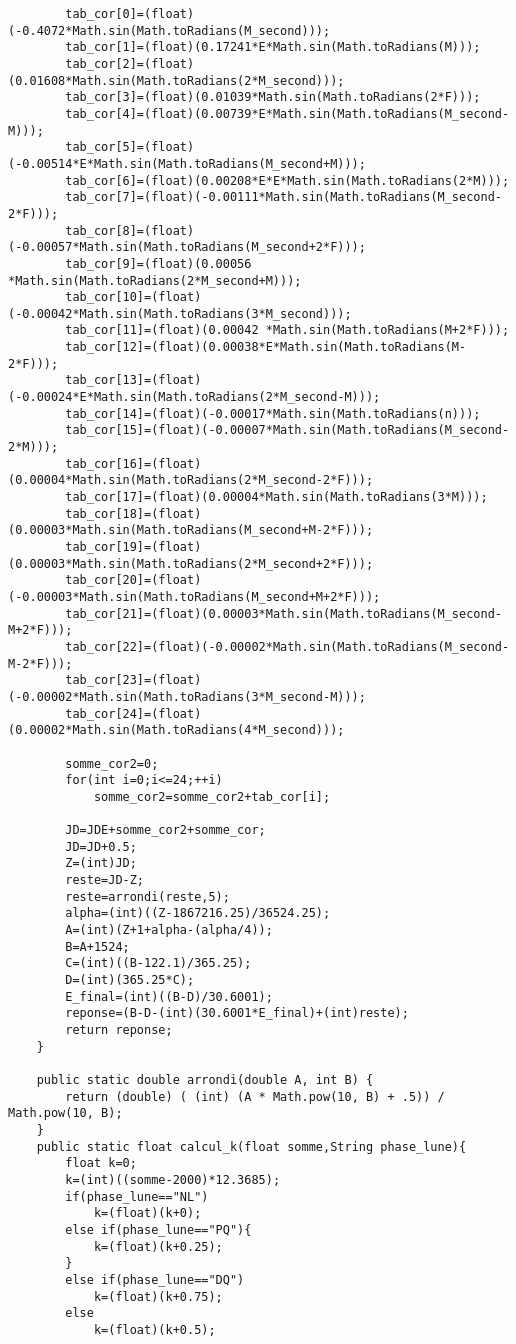 \begin{lstlisting}
        tab_cor[0]=(float)(-0.4072*Math.sin(Math.toRadians(M_second)));
        tab_cor[1]=(float)(0.17241*E*Math.sin(Math.toRadians(M)));
        tab_cor[2]=(float)(0.01608*Math.sin(Math.toRadians(2*M_second)));
        tab_cor[3]=(float)(0.01039*Math.sin(Math.toRadians(2*F)));
        tab_cor[4]=(float)(0.00739*E*Math.sin(Math.toRadians(M_second-M)));
        tab_cor[5]=(float)(-0.00514*E*Math.sin(Math.toRadians(M_second+M)));
        tab_cor[6]=(float)(0.00208*E*E*Math.sin(Math.toRadians(2*M)));
        tab_cor[7]=(float)(-0.00111*Math.sin(Math.toRadians(M_second-2*F)));
        tab_cor[8]=(float)(-0.00057*Math.sin(Math.toRadians(M_second+2*F)));
        tab_cor[9]=(float)(0.00056 *Math.sin(Math.toRadians(2*M_second+M)));
        tab_cor[10]=(float)(-0.00042*Math.sin(Math.toRadians(3*M_second)));
        tab_cor[11]=(float)(0.00042 *Math.sin(Math.toRadians(M+2*F)));
        tab_cor[12]=(float)(0.00038*E*Math.sin(Math.toRadians(M-2*F)));
        tab_cor[13]=(float)(-0.00024*E*Math.sin(Math.toRadians(2*M_second-M)));
        tab_cor[14]=(float)(-0.00017*Math.sin(Math.toRadians(n)));
        tab_cor[15]=(float)(-0.00007*Math.sin(Math.toRadians(M_second-2*M)));
        tab_cor[16]=(float)(0.00004*Math.sin(Math.toRadians(2*M_second-2*F)));
        tab_cor[17]=(float)(0.00004*Math.sin(Math.toRadians(3*M)));
        tab_cor[18]=(float)(0.00003*Math.sin(Math.toRadians(M_second+M-2*F)));
        tab_cor[19]=(float)(0.00003*Math.sin(Math.toRadians(2*M_second+2*F)));
        tab_cor[20]=(float)(-0.00003*Math.sin(Math.toRadians(M_second+M+2*F)));
        tab_cor[21]=(float)(0.00003*Math.sin(Math.toRadians(M_second-M+2*F)));
        tab_cor[22]=(float)(-0.00002*Math.sin(Math.toRadians(M_second-M-2*F)));
        tab_cor[23]=(float)(-0.00002*Math.sin(Math.toRadians(3*M_second-M)));
        tab_cor[24]=(float)(0.00002*Math.sin(Math.toRadians(4*M_second)));

        somme_cor2=0;
        for(int i=0;i<=24;++i)
            somme_cor2=somme_cor2+tab_cor[i];

        JD=JDE+somme_cor2+somme_cor;
        JD=JD+0.5;
        Z=(int)JD;
        reste=JD-Z;
        reste=arrondi(reste,5);
        alpha=(int)((Z-1867216.25)/36524.25);
        A=(int)(Z+1+alpha-(alpha/4));
        B=A+1524;
        C=(int)((B-122.1)/365.25);
        D=(int)(365.25*C);
        E_final=(int)((B-D)/30.6001);
        reponse=(B-D-(int)(30.6001*E_final)+(int)reste);
        return reponse;
    }

    public static double arrondi(double A, int B) {
        return (double) ( (int) (A * Math.pow(10, B) + .5)) / Math.pow(10, B);
    }
    public static float calcul_k(float somme,String phase_lune){
        float k=0;
        k=(int)((somme-2000)*12.3685);
        if(phase_lune=="NL")
            k=(float)(k+0);
        else if(phase_lune=="PQ"){
            k=(float)(k+0.25);
        }
        else if(phase_lune=="DQ")
            k=(float)(k+0.75);
        else
            k=(float)(k+0.5);


\end{lstlisting}
